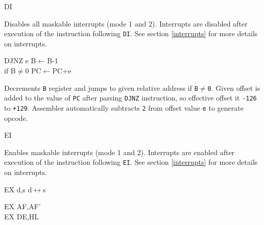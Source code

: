 \documentclass[12pt,twoside,openright,a4paper]{book}
\begin{document}
\begin{basedescript}{
	\desclabelstyle{\multilinelabel}
	\desclabelwidth{3cm}}
	\begin{detailitem}{DI}
		{}

		Disables all maskable interrupts (mode 1 and 2). Interrupts are disabled after execution of the instruction following {\tt DI}. See section \ref{interrupts} for more details on interrupts.
		
		\DetailNoEffect
				
		\begin{DetailTiming}
		\end{DetailTiming}

	\end{detailitem}

	\begin{detailitem}{DJNZ e}
		{B$\leftarrow$B-1\\
		if B$\not=$0 PC$\leftarrow$PC+e}

		Decrements {\tt B} register and jumps to given relative address if {\tt B$\not=$0}. Given offset is added to the value of {\tt PC} after parsing {\tt DJNZ} instruction, so effective offset it {\tt -126} to {\tt +129}. Assembler automatically subtracts {\tt 2} from offset value {\tt e} to generate opcode.

		\DetailNoEffect
				
		\begin{DetailTiming}
			\DetailTime{B=0}{2}{8}
			\DetailTime{B$\not=$0}{3}{13}
		\end{DetailTiming}

	\end{detailitem}

	\pagebreak
	\begin{detailitem}{EI}
		{}

		Enables maskable interrupts (mode 1 and 2). Interrupts are enabled after execution of the instruction following {\tt EI}. See section \ref{interrupts} for more details on interrupts.

		\DetailNoEffect
				
		\begin{DetailTiming}
			\DetailTime{}{1}{4}
		\end{DetailTiming}

	\end{detailitem}

	\begin{detailitem}{EX d,s}
		{d$\leftrightarrow$s}

		\begin{DetailVariants}
			EX AF,AF'\\
			EX DE,HL


\end{DetailVariants}
\end{detailitem}
\end{basedescript}
\end{document}
